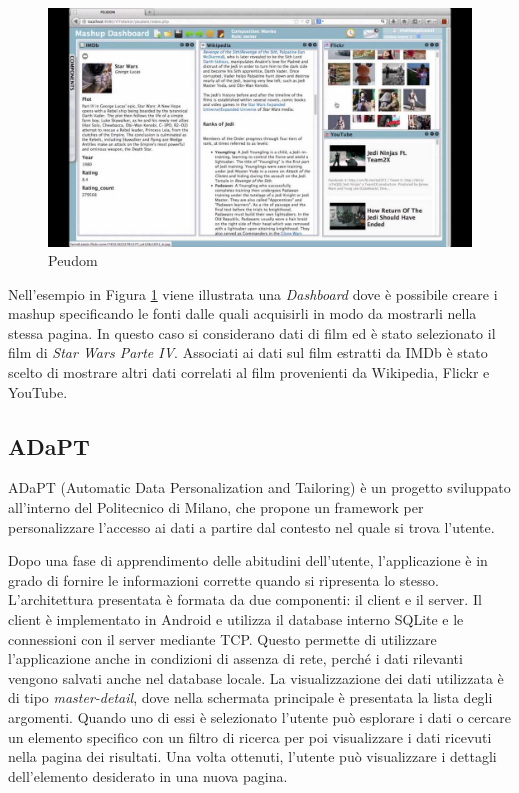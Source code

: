 \begin{figure}[ht]
	\centering
	\includegraphics[width=\textwidth]{2-nozioni-preliminari/Immagini/peudom.jpg}
	\caption{Peudom}\label{fig:peudom}
\end{figure}

Nell'esempio in Figura \ref{fig:peudom} viene illustrata una \emph{Dashboard} dove è possibile creare i mashup specificando le fonti dalle quali acquisirli in modo da mostrarli nella stessa pagina. In questo caso si considerano dati di film ed è stato selezionato il film di \emph{Star Wars Parte IV}. Associati ai dati sul film estratti da IMDb è stato scelto di mostrare altri dati correlati al film provenienti da Wikipedia, Flickr e YouTube.

\subsection*{ADaPT}

ADaPT \cite{6816749_ADaPT} (Automatic Data Personalization and Tailoring) è un progetto sviluppato all'interno del Politecnico di Milano, che propone un framework per personalizzare l'accesso ai dati a partire dal contesto nel quale si trova l'utente. 

Dopo una fase di apprendimento delle abitudini dell'utente, l'applicazione è in grado di fornire le informazioni corrette quando si ripresenta lo stesso.
L'architettura presentata è formata da due componenti: il client e il server.
Il client è implementato in Android e utilizza il database interno SQLite e le connessioni con il server mediante TCP. Questo permette di utilizzare l'applicazione anche in condizioni di assenza di rete, perché i dati rilevanti vengono salvati anche nel database locale. La visualizzazione dei dati utilizzata è di tipo \emph{master-detail}, %
dove nella schermata principale è presentata la lista degli argomenti. Quando uno di essi è selezionato l'utente può esplorare i dati o cercare un elemento specifico con un filtro di ricerca per poi visualizzare i dati ricevuti nella pagina dei risultati. Una volta ottenuti, l'utente può visualizzare i dettagli dell'elemento desiderato in una nuova pagina. 

